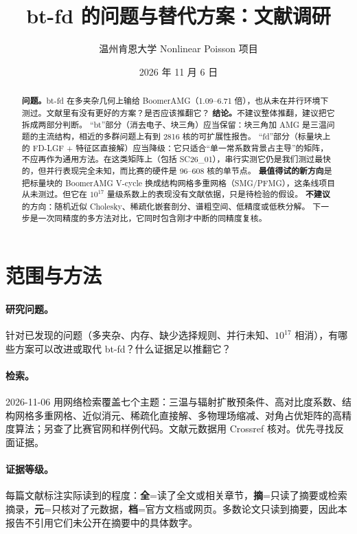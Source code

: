 \documentclass[11pt,a4paper]{ctexart}
\title{bt-fd 的问题与替代方案：文献调研}
\author{温州肯恩大学 \quad Nonlinear Poisson 项目}
\date{2026 年 11 月 6 日}
\begin{document}
\maketitle
\sloppy

\begin{abstract}
\textbf{问题。}bt-fd 在多夹杂几何上输给 BoomerAMG（1.09--6.71 倍），也从未在并行环境下测过。文献里有没有更好的方案？是否应该推翻它？
\textbf{结论。}不建议整体推翻，建议把它拆成两部分判断。
“bt”部分（消去电子、块三角）应当保留：块三角加 AMG 是三温问题的主流结构\cite{shu2021}，相近的多群问题上有到 2816 核的可扩展性报告\cite{yue2024}。
“fd”部分（标量块上的 FD-LGF + 特征区直接解）应当降级：它只适合“单一常系数背景占主导”的矩阵，不应再作为通用方法。在这类矩阵上（包括 SC26\_01），串行实测它仍是我们测过最快的，但并行表现完全未知，而比赛的硬件是 96--608 核的单节点。
\textbf{最值得试的新方向}是把标量块的 BoomerAMG V-cycle 换成结构网格多重网格（SMG/PFMG），这条线项目从未测过。但它在 $10^{17}$ 量级系数上的表现没有文献依据，只是待检验的假设。
\textbf{不建议}的方向：随机近似 Cholesky、稀疏化嵌套剖分、谱粗空间、低精度或低秩分解。
下一步是一次同精度的多方法对比，它同时包含刚才中断的同精度复核。
\end{abstract}

\section{范围与方法}
\paragraph{研究问题。}针对已发现的问题（多夹杂、内存、缺少选择规则、并行未知、$10^{17}$ 相消），有哪些方案可以改进或取代 bt-fd？什么证据足以推翻它？

\paragraph{检索。}2026-11-06 用网络检索覆盖七个主题：三温与辐射扩散预条件、高对比度系数、结构网格多重网格、近似消元、稀疏化直接解、多物理场缩减、对角占优矩阵的高精度算法；另查了比赛官网和样例代码。文献元数据用 Crossref 核对。优先寻找反面证据。

\paragraph{证据等级。}每篇文献标注实际读到的程度：\textbf{全}=读了全文或相关章节，\textbf{摘}=只读了摘要或检索摘录，\textbf{元}=只核对了元数据，\textbf{档}=官方文档或网页。多数论文只读到摘要，因此本报告不引用它们未公开在摘要中的具体数字。
\end{document}
